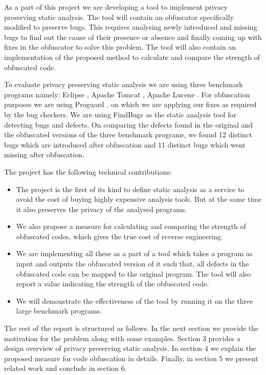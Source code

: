 \documentclass[twocolumn]{article}
\begin{document}
As a part of this project we are developing a tool to implement privacy preserving static analysis. The tool will contain an obfuscator specifically modified to preserve bugs. This 
requires analysing newly introduced and missing bugs to find out the cause of their presence or absence and finally coming up with fixes in the obfuscator to solve this problem. The 
tool will also contain an implementation of the proposed method to calculate and compare the strength of obfuscated code.

To evaluate privacy preserving static analysis we are using three benchmark programs namely: Eclipse \cite{eclipse}, Apache Tomcat \cite{tomcat}, Apache Lucene \cite{lucene}. For 
obfuscation purposes we are using Proguard \cite{proguard}, on which we are applying our fixes as required by the bug checkers. We are using FindBugs \cite{findbugs} as the static 
analysis tool for detecting bugs and defects. On comparing the defects found in the original and the obfuscated versions of the three benchmark programs, we found 12 distinct bugs 
which are introduced after obfuscation and 11 distinct bugs which went missing after obfuscation.

The project has the following technical contributions:
\begin{itemize}
	\item The project is the first of its kind to define static analysis as a service to avoid the cost of buying highly expensive analysis tools. But at the same time it also 
	preserves the privacy of the analysed programs.
	\item We also propose a measure for calculating and comparing the strength of obfuscated codes, which gives the true cost of reverse engineering.
	\item We are implementing all these as a part of a tool which takes a program  as input and outputs the obfuscated version of it such that, all defects in the obfuscated code 
	can be mapped to the original program. The tool will also report a value indicating the strength of the obfuscated code.
	\item We will demonstrate the effectiveness of the tool by running it on the three large benchmark programs.
\end{itemize}

The rest of the report is structured as follows. In the next section we provide the motivation for the problem along with some examples. Section 3 provides a design overview of privacy 
preserving static analysis. In section 4 we explain the proposed measure for code obfuscation in details. Finally, in section 5 we present related work and conclude in section 6.
\end{document}
